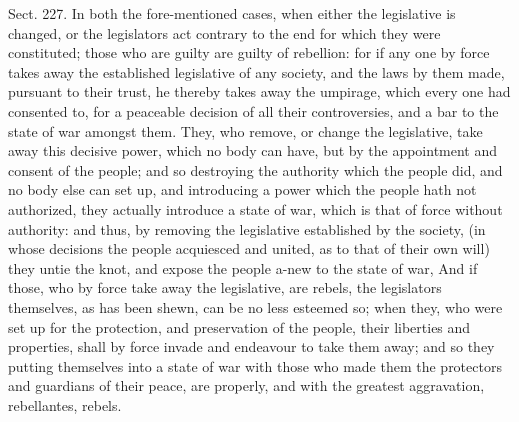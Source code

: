 \documentclass[11pt,openany]{book}
\begin{document}
Sect. 227. In both the fore-mentioned cases, when either the legislative is changed, or the legislators act contrary to the end for which they were constituted; those who are guilty are guilty of rebellion: for if any one by force takes away the established legislative of any society, and the laws by them made, pursuant to their trust, he thereby takes away the umpirage, which every one had consented to, for a peaceable decision of all their controversies, and a bar to the state of war amongst them. They, who remove, or change the legislative, take away this decisive power, which no body can have, but by the appointment and consent of the people; and so destroying the authority which the people did, and no body else can set up, and introducing a power which the people hath not authorized, they actually introduce a state of war, which is that of force without authority: and thus, by removing the legislative established by the society, (in whose decisions the people acquiesced and united, as to that of their own will) they untie the knot, and expose the people a-new to the state of war, And if those, who by force take away the legislative, are rebels, the legislators themselves, as has been shewn, can be no less esteemed so; when they, who were set up for the protection, and preservation of the people, their liberties and properties, shall by force invade and endeavour to take them away; and so they putting themselves into a state of war with those who made them the protectors and guardians of their peace, are properly, and with the greatest aggravation, rebellantes, rebels.
\end{document}
